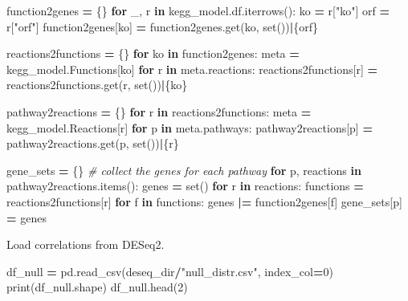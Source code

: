 \documentclass[
]{book}
\newenvironment{Shaded}{\begin{snugshade}}{\end{snugshade}}
\newcommand{\BuiltInTok}[1]{#1}
\newcommand{\CommentTok}[1]{\textcolor[rgb]{0.56,0.35,0.01}{\textit{#1}}}
\newcommand{\ControlFlowTok}[1]{\textcolor[rgb]{0.13,0.29,0.53}{\textbf{#1}}}
\newcommand{\DecValTok}[1]{\textcolor[rgb]{0.00,0.00,0.81}{#1}}
\newcommand{\KeywordTok}[1]{\textcolor[rgb]{0.13,0.29,0.53}{\textbf{#1}}}
\newcommand{\NormalTok}[1]{#1}
\newcommand{\OperatorTok}[1]{\textcolor[rgb]{0.81,0.36,0.00}{\textbf{#1}}}
\newcommand{\StringTok}[1]{\textcolor[rgb]{0.31,0.60,0.02}{#1}}
\begin{document}
\begin{Shaded}
\begin{Highlighting}[numbers=left,,]
\NormalTok{function2genes }\OperatorTok{=}\NormalTok{ \{\}}
\ControlFlowTok{for}\NormalTok{ \_, r }\KeywordTok{in}\NormalTok{ kegg\_model.df.iterrows():}
\NormalTok{    ko }\OperatorTok{=}\NormalTok{ r[}\StringTok{"ko"}\NormalTok{]}
\NormalTok{    orf }\OperatorTok{=}\NormalTok{ r[}\StringTok{"orf"}\NormalTok{]}
\NormalTok{    function2genes[ko] }\OperatorTok{=}\NormalTok{ function2genes.get(ko, }\BuiltInTok{set}\NormalTok{())}\OperatorTok{|}\NormalTok{\{orf\}}

\NormalTok{reactions2functions }\OperatorTok{=}\NormalTok{ \{\}}
\ControlFlowTok{for}\NormalTok{ ko }\KeywordTok{in}\NormalTok{ function2genes:}
\NormalTok{    meta }\OperatorTok{=}\NormalTok{ kegg\_model.Functions[ko]}
    \ControlFlowTok{for}\NormalTok{ r }\KeywordTok{in}\NormalTok{ meta.reactions:}
\NormalTok{        reactions2functions[r] }\OperatorTok{=}\NormalTok{ reactions2functions.get(r, }\BuiltInTok{set}\NormalTok{())}\OperatorTok{|}\NormalTok{\{ko\}}

\NormalTok{pathway2reactions }\OperatorTok{=}\NormalTok{ \{\}}
\ControlFlowTok{for}\NormalTok{ r }\KeywordTok{in}\NormalTok{ reactions2functions:}
\NormalTok{    meta }\OperatorTok{=}\NormalTok{ kegg\_model.Reactions[r]}
    \ControlFlowTok{for}\NormalTok{ p }\KeywordTok{in}\NormalTok{ meta.pathways:}
\NormalTok{        pathway2reactions[p] }\OperatorTok{=}\NormalTok{ pathway2reactions.get(p, }\BuiltInTok{set}\NormalTok{())}\OperatorTok{|}\NormalTok{\{r\}}

\NormalTok{gene\_sets }\OperatorTok{=}\NormalTok{ \{\} }\CommentTok{\# collect the genes for each pathway}
\ControlFlowTok{for}\NormalTok{ p, reactions }\KeywordTok{in}\NormalTok{ pathway2reactions.items():}
\NormalTok{    genes }\OperatorTok{=} \BuiltInTok{set}\NormalTok{()}
    \ControlFlowTok{for}\NormalTok{ r }\KeywordTok{in}\NormalTok{ reactions:}
\NormalTok{        functions }\OperatorTok{=}\NormalTok{ reactions2functions[r]}
        \ControlFlowTok{for}\NormalTok{ f }\KeywordTok{in}\NormalTok{ functions:}
\NormalTok{            genes }\OperatorTok{|=}\NormalTok{ function2genes[f]}
\NormalTok{    gene\_sets[p] }\OperatorTok{=}\NormalTok{ genes}
\end{Highlighting}
\end{Shaded}

Load correlations from DESeq2.

\begin{Shaded}
\begin{Highlighting}[numbers=left,,]
\NormalTok{df\_null }\OperatorTok{=}\NormalTok{ pd.read\_csv(deseq\_dir}\OperatorTok{/}\StringTok{"null\_distr.csv"}\NormalTok{, index\_col}\OperatorTok{=}\DecValTok{0}\NormalTok{)}
\BuiltInTok{print}\NormalTok{(df\_null.shape)}
\NormalTok{df\_null.head(}\DecValTok{2}\NormalTok{)}
\end{Highlighting}
\end{Shaded}
\end{document}
